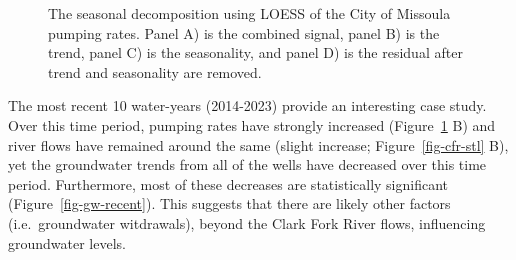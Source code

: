 \documentclass[
  letterpaper,
  DIV=11,
  numbers=noendperiod]{scrartcl}
\begin{document}
\begin{figure}


\caption{\label{fig-pumping-stl}The seasonal decomposition using LOESS
of the City of Missoula pumping rates. Panel A) is the combined signal,
panel B) is the trend, panel C) is the seasonality, and panel D) is the
residual after trend and seasonality are removed.}

\end{figure}%

The most recent 10 water-years (2014-2023) provide an interesting case
study. Over this time period, pumping rates have strongly increased
(Figure~\ref{fig-pumping-stl} B) and river flows have remained around
the same (slight increase; Figure~\ref{fig-cfr-stl} B), yet the
groundwater trends from all of the wells have decreased over this time
period. Furthermore, most of these decreases are statistically
significant (Figure~\ref{fig-gw-recent}). This suggests that there are
likely other factors (i.e.~groundwater witdrawals), beyond the Clark
Fork River flows, influencing groundwater levels.
\end{document}
